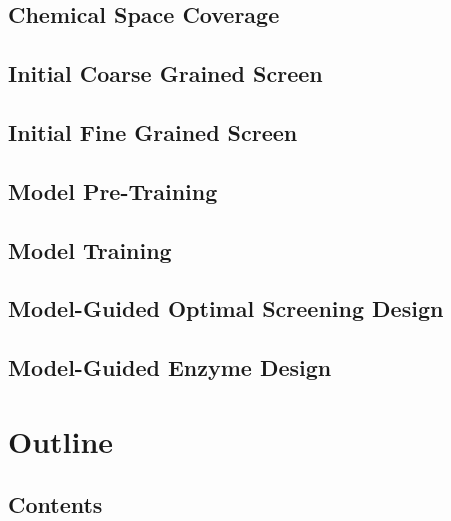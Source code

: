 \hypertarget{chemical-space-coverage}{%
\subsection{Chemical Space Coverage}\label{chemical-space-coverage}}

\hypertarget{initial-coarse-grained-screen}{%
\subsection{Initial Coarse Grained
Screen}\label{initial-coarse-grained-screen}}

\hypertarget{initial-fine-grained-screen}{%
\subsection{Initial Fine Grained
Screen}\label{initial-fine-grained-screen}}

\hypertarget{model-pre-training}{%
\subsection{Model Pre-Training}\label{model-pre-training}}

\hypertarget{model-training}{%
\subsection{Model Training}\label{model-training}}

\hypertarget{model-guided-optimal-screening-design}{%
\subsection{Model-Guided Optimal Screening
Design}\label{model-guided-optimal-screening-design}}

\hypertarget{model-guided-enzyme-design}{%
\subsection{Model-Guided Enzyme
Design}\label{model-guided-enzyme-design}}

\hypertarget{outline}{%
\section{Outline}\label{outline}}

\hypertarget{contents-19}{%
\subsection{Contents}\label{contents-19}}

